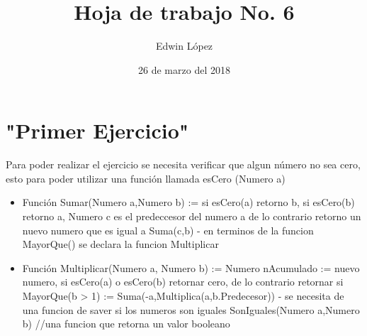 \documentclass{article}
\author{Edwin L\'opez}
\title {\textbf{Hoja de trabajo No. 6}}
\date {26 de marzo del 2018}
\begin{document}
\maketitle


\section{"Primer Ejercicio"}
Para poder realizar el ejercicio se necesita verificar que algun n\'umero no sea cero, esto para poder utilizar una funci\'on llamada esCero (Numero a)

\begin{itemize}

\item Funci\'on Sumar(Numero a,Numero b) := si esCero(a) retorno b, si esCero(b) retorno a, Numero c es el predeccesor del numero a de lo contrario retorno un nuevo numero que es igual a Suma(c,b)
- en terminos de la funcion MayorQue() se declara la funcion Multiplicar

\item Funci\'on Multiplicar(Numero a, Numero b) := Numero nAcumulado := nuevo numero, si esCero(a) o esCero(b) retornar cero, de lo contrario retornar si MayorQue(b > 1) := Suma(-a,Multiplica(a,b.Predecesor)) - se necesita de una funcion de saver si los numeros son iguales SonIguales(Numero a,Numero b) //una funcion que retorna un valor booleano

\end{itemize}
\end{document}
